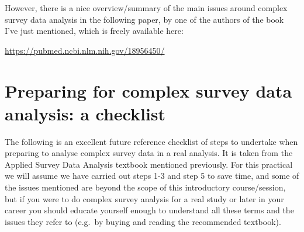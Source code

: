 \documentclass[
]{book}
\begin{document}
However, there is a nice overview/summary of the main issues around complex survey data analysis in the following paper, by one of the authors of the book I've just mentioned, which is freely available here:

\url{https://pubmed.ncbi.nlm.nih.gov/18956450/}

\hypertarget{preparing-for-complex-survey-data-analysis-a-checklist}{%
\section{Preparing for complex survey data analysis: a checklist}\label{preparing-for-complex-survey-data-analysis-a-checklist}}

The following is an excellent future reference checklist of steps to undertake when preparing to analyse complex survey data in a real analysis. It is taken from the Applied Survey Data Analysis textbook mentioned previously. For this practical we will assume we have carried out steps 1-3 and step 5 to save time, and some of the issues mentioned are beyond the scope of this introductory course/session, but if you were to do complex survey analysis for a real study or later in your career you should educate yourself enough to understand all these terms and the issues they refer to (e.g.~by buying and reading the recommended textbook).
\end{document}
